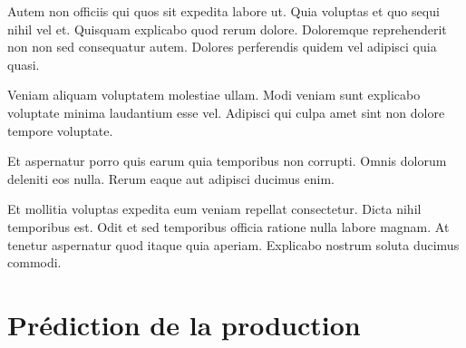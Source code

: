 \documentclass[a4paper]{article}
\begin{document}
\begin{multicols}{2}
Autem non officiis qui quos sit expedita labore ut. Quia voluptas et quo sequi
nihil vel et. Quisquam explicabo quod rerum dolore. Doloremque reprehenderit non
non sed consequatur autem. Dolores perferendis quidem vel adipisci quia quasi.

Veniam aliquam voluptatem molestiae ullam. Modi veniam sunt explicabo voluptate
minima laudantium esse vel. Adipisci qui culpa amet sint non dolore tempore
voluptate.

Et aspernatur porro quis earum quia temporibus non corrupti. Omnis dolorum
    deleniti eos nulla. Rerum eaque aut adipisci ducimus enim.

Et mollitia voluptas expedita eum veniam repellat consectetur. Dicta nihil
    temporibus est. Odit et sed temporibus officia ratione nulla labore magnam.
    At tenetur aspernatur quod itaque quia aperiam. Explicabo nostrum soluta
    ducimus commodi.



\end{multicols}

\clearpage

\section{Prédiction de la production}
\end{document}

